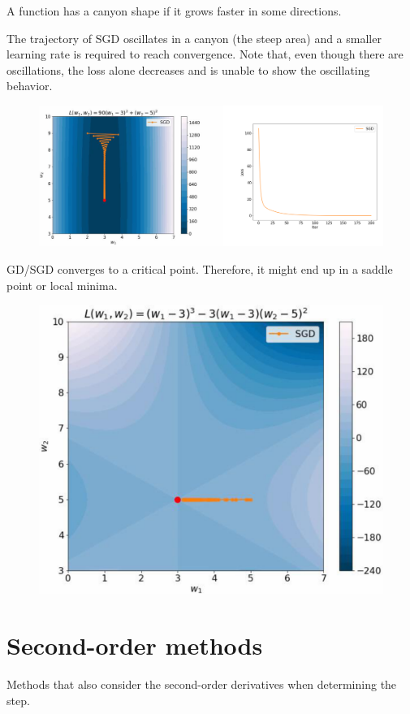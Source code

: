 \begin{remark}[Canyons] 
    A function has a canyon shape if it grows faster in some directions.

    The trajectory of SGD oscillates in a canyon (the steep area) and a smaller learning rate is required to reach convergence. Note that, even though there are oscillations, the loss alone decreases and is unable to show the oscillating behavior.

    \begin{figure}[H]
        \centering
        \includegraphics[width=0.8\linewidth]{./img/sgd_canyon.png}
    \end{figure}
\end{remark}

\begin{remark} 
    GD/SGD converges to a critical point. Therefore, it might end up in a saddle point or local minima.

    \begin{figure}[H]
        \centering
        \includegraphics[width=0.35\linewidth]{./img/sgd_local_minima.png}
    \end{figure}
\end{remark}



\section{Second-order methods}

Methods that also consider the second-order derivatives when determining the step.

